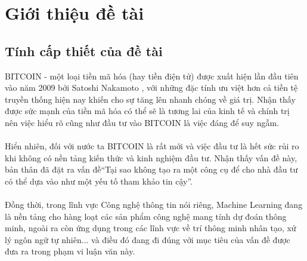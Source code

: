 \chapter{Giới thiệu đề tài}
\section{Tính cấp thiết của đề tài}
BITCOIN - một loại tiền mã hóa (hay tiền điện tử) được xuất hiện lần đầu tiên 
vào năm 2009 bởi Satoshi Nakamoto \cite{Bitcoin}, với những đặc tính ưu việt hơn cả tiền tệ 
truyền thống hiện nay khiến cho sự tăng lên nhanh chóng về giá trị. Nhận thấy 
được sức mạnh của tiền mã hóa có thể sẽ là tương lai của kinh tế và chính trị 
nên việc hiểu rõ cũng như đầu tư vào BITCOIN là việc đáng để suy ngẫm.\\\\
Hiển nhiên, đối với nước ta BITCOIN là rất mới và việc đầu tư là hết sức rủi ro
khi không có nền tảng kiến thức và kinh nghiệm đầu tư. Nhận thấy vấn đề này, 
bản thân đã đặt ra vấn đề``Tại sao không tạo ra một công cụ để cho nhà đầu tư 
có thể dựa vào như một yếu tố tham khảo tin cậy''.\\\\
Đồng thời, trong lĩnh vực Công nghệ thông tin nói riêng, Machine Learning đang là 
nền tảng cho hàng loạt các sản phẩm công nghệ mang tính dự đoán thông minh, ngoài 
ra còn ứng dụng trong các lĩnh vực về trí thông minh nhân tạo, xử lý ngôn ngữ 
tự nhiên... và điều đó đang đi đúng với mục tiêu của vấn đề được đưa ra trong phạm 
vi luận văn này.

